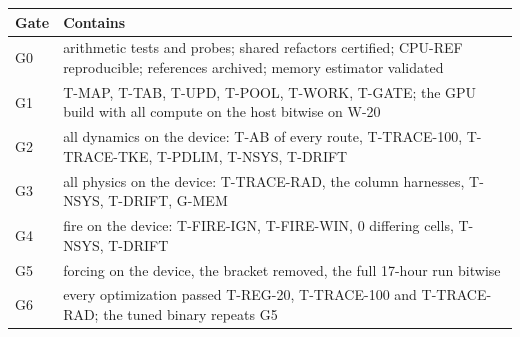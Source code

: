 \begin{center}
\small
\begin{tabular}{lp{}}
\toprule
Gate & Contains \\
\midrule
G0 & arithmetic tests and probes; shared refactors certified; CPU-REF reproducible; references archived; memory estimator validated \\
G1 & T-MAP, T-TAB, T-UPD, T-POOL, T-WORK, T-GATE; the GPU build with all compute on the host bitwise on W-20 \\
G2 & all dynamics on the device: T-AB of every route, T-TRACE-100, T-TRACE-TKE, T-PDLIM, T-NSYS, T-DRIFT \\
G3 & all physics on the device: T-TRACE-RAD, the column harnesses, T-NSYS, T-DRIFT, G-MEM \\
G4 & fire on the device: T-FIRE-IGN, T-FIRE-WIN, 0 differing cells, T-NSYS, T-DRIFT \\
G5 & forcing on the device, the bracket removed, the full 17-hour run bitwise \\
G6 & every optimization passed T-REG-20, T-TRACE-100 and T-TRACE-RAD; the tuned binary repeats G5 \\
\bottomrule
\end{tabular}
\end{center}
